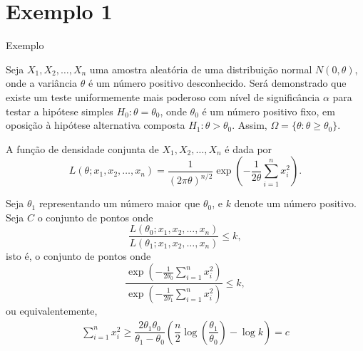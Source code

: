 \documentclass[12pt]{beamer}
\begin{document}
\section{Exemplo 1}
\begin{frame}{Exemplo}
\begin{block}{}
\justifying
Seja $X_1, X_2, \ldots, X_n$ uma amostra aleatória de uma distribuição normal $N(0, \theta)$, onde a variância $\theta$ é um número positivo desconhecido. Será demonstrado que existe um teste uniformemente mais poderoso com nível de significância $\alpha$ para testar a hipótese simples $H_0: \theta = \theta_0$, onde $\theta_0$ é um número positivo fixo, em oposição à hipótese alternativa composta $H_1: \theta > \theta_0$. Assim, $\Omega = \{\theta : \theta \geq \theta_0\}$.

A função de densidade conjunta de $X_1, X_2, \ldots, X_n$ é dada por
\begin{equation}
L(\theta; x_1, x_2, \ldots, x_n) = \frac{1}{(2\pi\theta)^{n/2}} \exp\left(-\frac{1}{2\theta}\sum_{i=1}^{n}x_i^2\right).
\end{equation}
\end{block}
\end{frame}

\begin{frame}{}
\begin{block}{}
\justifying
Seja $\theta_1$ representando um número maior que $\theta_0$, e $k$ denote um número positivo. Seja $C$ o conjunto de pontos onde
\begin{equation}
\frac{L(\theta_0; x_1, x_2, \ldots, x_n)}{L(\theta_1; x_1, x_2, \ldots, x_n)} \leq k,
\end{equation}
isto é, o conjunto de pontos onde
\begin{equation}
\frac{\exp\left(-\frac{1}{2\theta_0}\sum_{i=1}^{n}x_i^2\right)}{\exp\left(-\frac{1}{2\theta_1}\sum_{i=1}^{n}x_i^2\right)} \leq k,
\end{equation}
ou equivalentemente,
\begin{align*}
\sum_{i=1}^{n}x_i^2 \geq \dfrac{2\theta_1\theta_0}{\theta_1-\theta_0}\left(\dfrac{n}{2}\log{\left(\dfrac{\theta_1}{\theta_0}\right)}-\log{k}\right)=c
\end{align*}
\end{block}
\end{frame}
\end{document}
